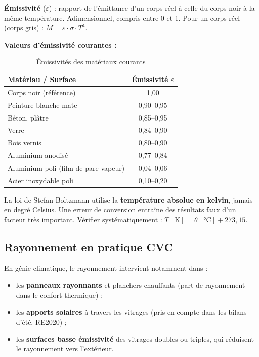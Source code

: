\begin{definition}
  \textbf{Émissivité} (\(\varepsilon\)) : rapport de l'émittance d'un corps réel à celle du
  corps noir à la même température. Adimensionnel, compris entre 0 et 1.
  Pour un corps réel (corps gris) : \(M = \varepsilon \cdot \sigma \cdot T^4\).
\end{definition}

\textbf{Valeurs d'émissivité courantes :}
\begin{table}[H]
  \centering
  \caption{Émissivités des matériaux courants}
  \begin{tabular}{lc}
    \toprule
    Matériau / Surface & Émissivité \(\varepsilon\) \\
    \midrule
    Corps noir (référence) & 1,00 \\
    Peinture blanche mate & 0,90–0,95 \\
    Béton, plâtre & 0,85–0,95 \\
    Verre & 0,84–0,90 \\
    Bois vernis & 0,80–0,90 \\
    Aluminium anodisé & 0,77–0,84 \\
    Aluminium poli (film de pare-vapeur) & 0,04–0,06 \\
    Acier inoxydable poli & 0,10–0,20 \\
    \bottomrule
  \end{tabular}
\end{table}

\begin{attention}
  La loi de Stefan-Boltzmann utilise la \textbf{température absolue en kelvin}, jamais en
  degré Celsius. Une erreur de conversion entraîne des résultats faux d'un facteur très
  important. Vérifier systématiquement : \(T\,[\si{\kelvin}] = \theta\,[\si{\degreeCelsius}]
  + 273{,}15\).
\end{attention}

\subsection{Rayonnement en pratique CVC}

En génie climatique, le rayonnement intervient notamment dans :
\begin{itemize}
  \item les \textbf{panneaux rayonnants} et planchers chauffants (part de rayonnement dans
        le confort thermique) ;
  \item les \textbf{apports solaires} à travers les vitrages (pris en compte dans les bilans
        d'été, RE2020) ;
  \item les \textbf{surfaces basse émissivité} des vitrages doubles ou triples, qui réduisent
        le rayonnement vers l'extérieur.
\end{itemize}

